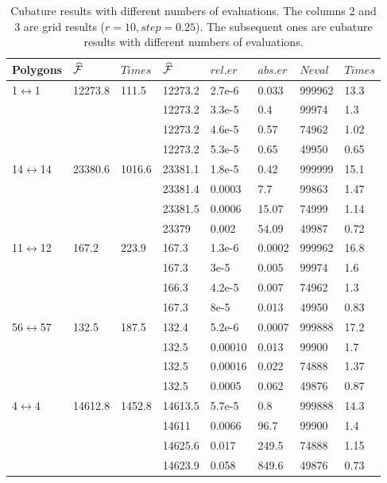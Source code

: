 \begin{table}
\footnotesize
\caption{\label{array:cub}  Cubature results with different numbers of
  evaluations.
The columns 2 and 3 are  grid results ($r=10,step=0.25$).
The subsequent ones are cubature results with different 
 numbers of evaluations.
}
\begin{center}
\begin{tabular}{|p{1.2cm}|p{1cm}|p{0.8cm}|p{1cm}|p{1.5cm}|p{1cm}|p{1cm}|p{0.8cm}|}
\hline
\textbf{Polygons} 
&  $\widehat{{\cal F}}$  
& $Times$
&  $\widehat{{\cal F}}$
& $rel.er$
& $abs.er$
&  $Neval$
& $Times $
 \\ \hline
1$\leftrightarrow$1  &
12273.8   & 111.5 &
12273.2 & 2.7e-6 & 0.033 & 999962 & 13.3 \\
 & & &
12273.2 & 3.3e-5 & 0.4 &   99974 & 1.3\\
 & & &
12273.2 &  4.6e-5 & 0.57 &74962  & 1.02 \\
 & & &
12273.2 & 5.3e-5 &  0.65 & 49950 & 0.65 \\
\hline
14$\leftrightarrow$14  &
23380.6  & 1016.6 &
23381.1 & 1.8e-5 & 0.42 & 999999 & 15.1 \\
 & & &
23381.4 & 0.0003 & 7.7 & 99863 & 1.47 \\
 & & &
23381.5 & 0.0006 & 15.07 & 74999 & 1.14\\
 & & &
23379 & 0.002 & 54.09 & 49987 & 0.72 \\
 \hline
11$\leftrightarrow$12  &
167.2  & 223.9 &
167.3 & 1.3e-6 &0.0002 & 999962 & 16.8 \\
 & & &
167.3 & 3e-5 & 0.005 & 99974 & 1.6 \\
 & & &
166.3 & 4.2e-5 & 0.007 &  74962 & 1.3 \\
 & & &
167.3 & 8e-5 & 0.013 & 49950 & 0.83 \\
 \hline
56$\leftrightarrow$57  &
132.5  & 187.5 &
132.4 & 5.2e-6 & 0.0007 & 999888 & 17.2\\
 & & &
132.5 & 0.00010 & 0.013 & 99900 & 1.7\\
 & & &
132.5 & 0.00016 & 0.022 & 74888 & 1.37\\
 & & &
132.5 & 0.0005 & 0.062 & 49876 & 0.87 \\
\hline
4$\leftrightarrow$4 &
 14612.8 & 1452.8 &
14613.5 & 5.7e-5 & 0.8 & 999888 & 14.3 \\
 & & &
14611 & 0.0066 &  96.7 & 99900 & 1.4\\
 & & &
14625.6 & 0.017 & 249.5 & 74888 & 1.15\\
 & & &
14623.9 & 0.058 & 849.6 & 49876 & 0.73 \\
 \hline


\end{tabular}
\end{center}
\normalsize
\end{table}

